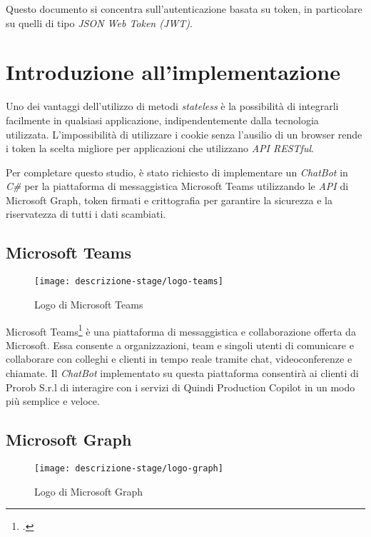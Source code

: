 \noindent Questo documento si concentra sull'autenticazione basata su token, in particolare su quelli di tipo \emph{JSON Web Token (JWT)}.


\section{Introduzione all'implementazione}
Uno dei vantaggi dell'utilizzo di metodi \emph{stateless} è la possibilità di integrarli facilmente in qualsiasi applicazione, indipendentemente dalla tecnologia utilizzata.
L'impossibilità di utilizzare i cookie senza l'ausilio di un browser rende i token la scelta migliore per applicazioni che utilizzano \emph{API RESTful}.

Per completare questo studio, è stato richiesto di implementare un \emph{ChatBot} in \emph{C\#} per la piattaforma di messaggistica Microsoft Teams utilizzando le \emph{API} di Microsoft Graph, token firmati e crittografia per garantire la sicurezza e la riservatezza di tutti i dati scambiati.

\subsection{Microsoft Teams}

\begin{figure}[!ht] 
	\centering 
	\texttt{[image: descrizione-stage/logo-teams]} 
	\caption{Logo di Microsoft Teams}
\end{figure}

Microsoft Teams\footcite{site:microsoft-teams} è una piattaforma di messaggistica e collaborazione offerta da Microsoft.
Essa consente a organizzazioni, team e singoli utenti di comunicare e collaborare con colleghi e clienti in tempo reale tramite chat, videoconferenze e chiamate.
Il \emph{ChatBot} implementato su questa piattaforma consentirà ai clienti di Prorob S.r.l di interagire con i servizi di Quindi Production Copilot in un modo più semplice e veloce.

\subsection{Microsoft Graph}

\begin{figure}[!ht] 
	\centering 
	\texttt{[image: descrizione-stage/logo-graph]} 
	\caption{Logo di Microsoft Graph}
\end{figure}

